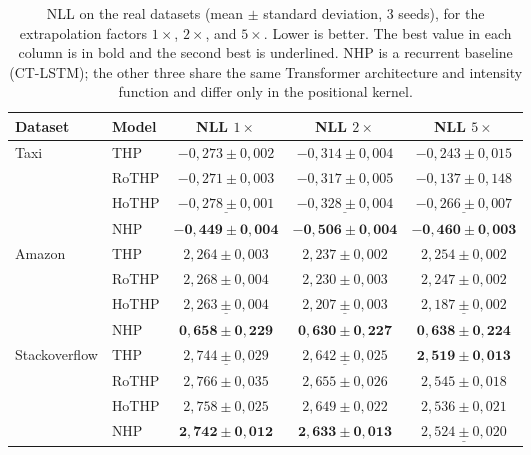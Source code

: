 \begin{table}[h!]
\centering
\caption{NLL on the real datasets (mean $\pm$ standard deviation, 3 seeds), for the extrapolation factors $1\times$, $2\times$, and $5\times$. Lower is better. The best value in each column is in bold and the second best is underlined. NHP is a recurrent baseline (CT-LSTM); the other three share the same Transformer architecture and intensity function and differ only in the positional kernel.}
\label{tab:resultados-reais}
\begin{tabular}{llccc}
\toprule
Dataset & Model & NLL $1\times$ & NLL $2\times$ & NLL $5\times$ \\
\midrule
\multirow{4}{*}{Taxi}
    & THP    & $-0{,}273 \pm 0{,}002$ & $-0{,}314 \pm 0{,}004$ & $-0{,}243 \pm 0{,}015$ \\
    & RoTHP  & $-0{,}271 \pm 0{,}003$ & $-0{,}317 \pm 0{,}005$ & $-0{,}137 \pm 0{,}148$ \\
    & HoTHP  & $\underline{-0{,}278 \pm 0{,}001}$ & $\underline{-0{,}328 \pm 0{,}004}$ & $\underline{-0{,}266 \pm 0{,}007}$ \\
    & NHP    & $\mathbf{-0{,}449 \pm 0{,}004}$ & $\mathbf{-0{,}506 \pm 0{,}004}$ & $\mathbf{-0{,}460 \pm 0{,}003}$ \\
\midrule
\multirow{4}{*}{Amazon}
    & THP    & $2{,}264 \pm 0{,}003$ & $2{,}237 \pm 0{,}002$ & $2{,}254 \pm 0{,}002$ \\
    & RoTHP  & $2{,}268 \pm 0{,}004$ & $2{,}230 \pm 0{,}003$ & $2{,}247 \pm 0{,}002$ \\
    & HoTHP  & $\underline{2{,}263 \pm 0{,}004}$ & $\underline{2{,}207 \pm 0{,}003}$ & $\underline{2{,}187 \pm 0{,}002}$ \\
    & NHP    & $\mathbf{0{,}658 \pm 0{,}229}$ & $\mathbf{0{,}630 \pm 0{,}227}$ & $\mathbf{0{,}638 \pm 0{,}224}$ \\
\midrule
\multirow{4}{*}{Stackoverflow}
    & THP    & $\underline{2{,}744 \pm 0{,}029}$ & $\underline{2{,}642 \pm 0{,}025}$ & $\mathbf{2{,}519 \pm 0{,}013}$ \\
    & RoTHP  & $2{,}766 \pm 0{,}035$ & $2{,}655 \pm 0{,}026$ & $2{,}545 \pm 0{,}018$ \\
    & HoTHP  & $2{,}758 \pm 0{,}025$ & $2{,}649 \pm 0{,}022$ & $2{,}536 \pm 0{,}021$ \\
    & NHP    & $\mathbf{2{,}742 \pm 0{,}012}$ & $\mathbf{2{,}633 \pm 0{,}013}$ & $\underline{2{,}524 \pm 0{,}020}$ \\
\bottomrule
\end{tabular}
\end{table}

